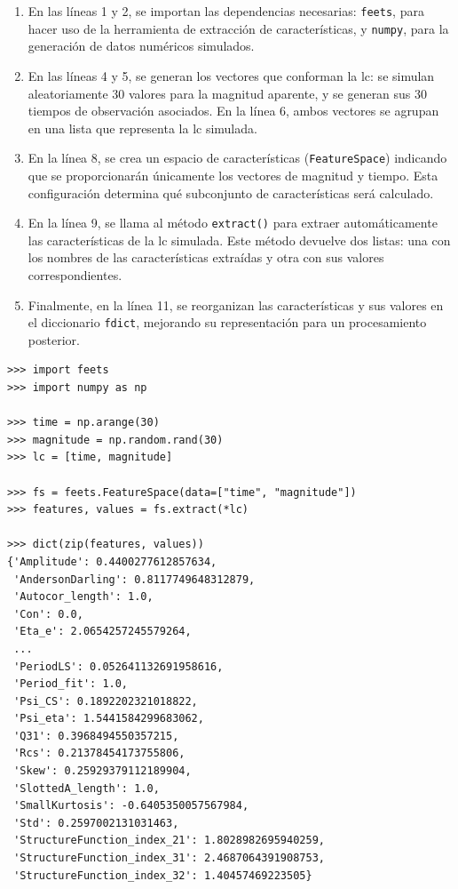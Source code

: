 \begin{enumerate}
    \item En las líneas 1 y 2, se importan las dependencias necesarias: \texttt{feets}, para hacer uso de la herramienta de extracción de características, y \texttt{numpy}, para la generación de datos numéricos simulados.

    \item En las líneas 4 y 5, se generan los vectores que conforman la \gls{lc}: se simulan aleatoriamente 30 valores para la magnitud aparente, y se generan sus 30 tiempos de observación asociados. En la línea 6, ambos vectores se agrupan en una lista que representa la \gls{lc} simulada.

    \item En la línea 8, se crea un espacio de características (\texttt{FeatureSpace}) indicando que se proporcionarán únicamente los vectores de magnitud y tiempo. Esta configuración determina qué subconjunto de características será calculado.

    \item En la línea 9, se llama al método \texttt{extract()} para extraer automáticamente las características de la \gls{lc} simulada. Este método devuelve dos listas: una con los nombres de las características extraídas y otra con sus valores correspondientes.

    \item Finalmente, en la línea 11, se reorganizan las características y sus valores en el diccionario \texttt{fdict}, mejorando su representación para un procesamiento posterior.
\end{enumerate}

\begin{code}
\begin{verbatim}
>>> import feets
>>> import numpy as np

>>> time = np.arange(30)
>>> magnitude = np.random.rand(30)
>>> lc = [time, magnitude]

>>> fs = feets.FeatureSpace(data=["time", "magnitude"])
>>> features, values = fs.extract(*lc)

>>> dict(zip(features, values))
{'Amplitude': 0.4400277612857634,
 'AndersonDarling': 0.8117749648312879,
 'Autocor_length': 1.0,
 'Con': 0.0,
 'Eta_e': 2.0654257245579264,
 ...
 'PeriodLS': 0.052641132691958616,
 'Period_fit': 1.0,
 'Psi_CS': 0.1892202321018822,
 'Psi_eta': 1.5441584299683062,
 'Q31': 0.3968494550357215,
 'Rcs': 0.21378454173755806,
 'Skew': 0.25929379112189904,
 'SlottedA_length': 1.0,
 'SmallKurtosis': -0.6405350057567984,
 'Std': 0.2597002131031463,
 'StructureFunction_index_21': 1.8028982695940259,
 'StructureFunction_index_31': 2.4687064391908753,
 'StructureFunction_index_32': 1.40457469223505}
\end{verbatim}
\caption{
    Ejemplo del uso de \gls{feets} para la extracción de características de una \gls{lc} simulada con magnitudes aleatorias.
}
\label{code:usage}
\end{code}


